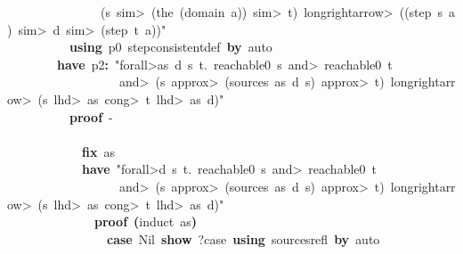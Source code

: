 \documentclass{article}
\newcommand{\syntaxKEYWORDA}[1]{\textcolor[rgb]{0.0,0.4,0.6}{\textbf{#1}}}
\newcommand{\syntaxKEYWORDC}[1]{\textcolor[rgb]{0.0,0.6,1.0}{\textbf{#1}}}
\newcommand{\syntaxLITERALA}[1]{\textcolor[rgb]{1.0,0.0,0.8}{#1}}
\newcommand{\syntaxOPERATOR}[1]{\textcolor[rgb]{0.0,0.0,0.0}{\textbf{#1}}}
\newcommand{\syntaxKEYWORDA}[1]{\textcolor[rgb]{0.0,0.4,0.6}{\textbf{#1}}}
\newcommand{\syntaxKEYWORDC}[1]{\textcolor[rgb]{0.0,0.6,1.0}{\textbf{#1}}}
\newcommand{\syntaxLITERALA}[1]{\textcolor[rgb]{1.0,0.0,0.8}{#1}}
\newcommand{\syntaxOPERATOR}[1]{\textcolor[rgb]{0.0,0.0,0.0}{\textbf{#1}}}
\newcommand{\syntaxKEYWORDA}[1]{\textcolor[rgb]{0.0,0.4,0.6}{\textbf{#1}}}
\newcommand{\syntaxKEYWORDC}[1]{\textcolor[rgb]{0.0,0.6,1.0}{\textbf{#1}}}
\newcommand{\syntaxLITERALA}[1]{\textcolor[rgb]{1.0,0.0,0.8}{#1}}
\newcommand{\syntaxOPERATOR}[1]{\textcolor[rgb]{0.0,0.0,0.0}{\textbf{#1}}}
\newcommand{\syntaxKEYWORDA}[1]{\textcolor[rgb]{0.0,0.4,0.6}{#1}}
\newcommand{\syntaxKEYWORDC}[1]{\textcolor[rgb]{0.0,0.6,1.0}{#1}}
\newcommand{\syntaxLITERALA}[1]{\textcolor[rgb]{1.0,0.0,0.8}{\textbf{#1}}}
\newcommand{\syntaxOPERATOR}[1]{\textcolor[rgb]{0.0,0.0,0.0}{#1}}
\newcommand{\syntaxKEYWORDA}[1]{\textcolor[rgb]{0.0,0.4,0.6}{\textbf{#1}}}
\newcommand{\syntaxKEYWORDC}[1]{\textcolor[rgb]{0.0,0.6,1.0}{\textbf{#1}}}
\newcommand{\syntaxLITERALA}[1]{\textcolor[rgb]{1.0,0.0,0.8}{#1}}
\newcommand{\syntaxOPERATOR}[1]{\textcolor[rgb]{0.0,0.0,0.0}{\textbf{#1}}}
\newcommand{\syntaxKEYWORDA}[1]{\textcolor[rgb]{0.0,0.4,0.6}{\textbf{#1}}}
\newcommand{\syntaxKEYWORDC}[1]{\textcolor[rgb]{0.0,0.6,1.0}{\textbf{#1}}}
\newcommand{\syntaxLITERALA}[1]{\textcolor[rgb]{1.0,0.0,0.8}{#1}}
\newcommand{\syntaxOPERATOR}[1]{\textcolor[rgb]{0.0,0.0,0.0}{\textbf{#1}}}
\begin{document}
\syntaxLITERALA{{\ }{\ }{\ }{\ }{\ }{\ }{\ }{\ }{\ }{\ }{\ }{\ }{\ }{\ }{\ }(s{\ }\<sim>{\ }(the{\ }(domain{\ }a)){\ }\<sim>{\ }t){\ }\<longrightarrow>{\ }((step{\ }s{\ }a){\ }\<sim>{\ }d{\ }\<sim>{\ }(step{\ }t{\ }a))"}\hspace*{\fill}\\
{\ }{\ }{\ }{\ }{\ }{\ }{\ }{\ }{\ }{\ }\syntaxKEYWORDA{using}{\ }p0{\ }step\usebox{\underscorebox}consistent\usebox{\underscorebox}def{\ }\syntaxKEYWORDA{by}{\ }auto\hspace*{\fill}\\
{\ }{\ }{\ }{\ }{\ }{\ }{\ }{\ }\syntaxKEYWORDA{have}{\ }p2\syntaxOPERATOR{:}{\ }\syntaxLITERALA{"\<forall>as{\ }d{\ }s{\ }t.{\ }reachable0{\ }s{\ }\<and>{\ }reachable0{\ }t}\hspace*{\fill}\\
\syntaxLITERALA{{\ }{\ }{\ }{\ }{\ }{\ }{\ }{\ }{\ }{\ }{\ }{\ }{\ }{\ }{\ }{\ }{\ }{\ }\<and>{\ }(s{\ }\<approx>{\ }(sources{\ }as{\ }d{\ }s){\ }\<approx>{\ }t){\ }\<longrightarrow>{\ }(s{\ }\<lhd>{\ }as{\ }\<cong>{\ }t{\ }\<lhd>{\ }as{\ }\usebox{\atbox}{\ }d)"}\hspace*{\fill}\\
{\ }{\ }{\ }{\ }{\ }{\ }{\ }{\ }{\ }{\ }\syntaxKEYWORDA{proof}{\ }{-}\hspace*{\fill}\\
{\ }{\ }{\ }{\ }{\ }{\ }{\ }{\ }{\ }{\ }\syntaxKEYWORDA{\usebox{\opencurlybracket}}\hspace*{\fill}\\
{\ }{\ }{\ }{\ }{\ }{\ }{\ }{\ }{\ }{\ }{\ }{\ }\syntaxKEYWORDC{fix}{\ }as\hspace*{\fill}\\
{\ }{\ }{\ }{\ }{\ }{\ }{\ }{\ }{\ }{\ }{\ }{\ }\syntaxKEYWORDA{have}{\ }\syntaxLITERALA{"\<forall>d{\ }s{\ }t.{\ }reachable0{\ }s{\ }\<and>{\ }reachable0{\ }t}\hspace*{\fill}\\
\syntaxLITERALA{{\ }{\ }{\ }{\ }{\ }{\ }{\ }{\ }{\ }{\ }{\ }{\ }{\ }{\ }{\ }{\ }{\ }{\ }\<and>{\ }(s{\ }\<approx>{\ }(sources{\ }as{\ }d{\ }s){\ }\<approx>{\ }t){\ }\<longrightarrow>{\ }(s{\ }\<lhd>{\ }as{\ }\<cong>{\ }t{\ }\<lhd>{\ }as{\ }\usebox{\atbox}{\ }d)"}\hspace*{\fill}\\
{\ }{\ }{\ }{\ }{\ }{\ }{\ }{\ }{\ }{\ }{\ }{\ }{\ }{\ }\syntaxKEYWORDA{proof}{\ }\syntaxOPERATOR{(}induct{\ }as\syntaxOPERATOR{)}\hspace*{\fill}\\
{\ }{\ }{\ }{\ }{\ }{\ }{\ }{\ }{\ }{\ }{\ }{\ }{\ }{\ }{\ }{\ }\syntaxKEYWORDC{case}{\ }Nil{\ }\syntaxKEYWORDC{show}{\ }?case{\ }\syntaxKEYWORDA{using}{\ }sources\usebox{\underscorebox}refl{\ }\syntaxKEYWORDA{by}{\ }auto\hspace*{\fill}\\
\end{document}
